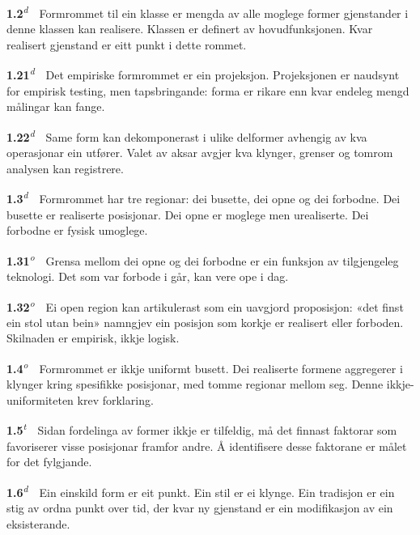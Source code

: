 \documentclass[10pt]{article}
\begin{document}
\noindent\textbf{1.2}\textsuperscript{\textit{d}}~~Formrommet til ein klasse er mengda av alle moglege former gjenstander i denne klassen kan realisere. Klassen er definert av hovudfunksjonen. Kvar realisert gjenstand er eitt punkt i dette rommet.




\noindent\textbf{1.21}\textsuperscript{\textit{d}}~~Det empiriske formrommet er ein projeksjon. Projeksjonen er naudsynt for empirisk testing, men tapsbringande: forma er rikare enn kvar endeleg mengd målingar kan fange.




\noindent\textbf{1.22}\textsuperscript{\textit{d}}~~Same form kan dekomponerast i ulike delformer avhengig av kva operasjonar ein utfører. Valet av aksar avgjer kva klynger, grenser og tomrom analysen kan registrere.




\noindent\textbf{1.3}\textsuperscript{\textit{d}}~~Formrommet har tre regionar: dei busette, dei opne og dei forbodne. Dei busette er realiserte posisjonar. Dei opne er moglege men urealiserte. Dei forbodne er fysisk umoglege.




\noindent\textbf{1.31}\textsuperscript{\textit{o}}~~Grensa mellom dei opne og dei forbodne er ein funksjon av tilgjengeleg teknologi. Det som var forbode i går, kan vere ope i dag.




\noindent\textbf{1.32}\textsuperscript{\textit{o}}~~Ei open region kan artikulerast som ein uavgjord proposisjon: «det finst ein stol utan bein» namngjev ein posisjon som korkje er realisert eller forboden. Skilnaden er empirisk, ikkje logisk.




\noindent\textbf{1.4}\textsuperscript{\textit{o}}~~Formrommet er ikkje uniformt busett. Dei realiserte formene aggregerer i klynger kring spesifikke posisjonar, med tomme regionar mellom seg. Denne ikkje-uniformiteten krev forklaring.




\noindent\textbf{1.5}\textsuperscript{\textit{t}}~~Sidan fordelinga av former ikkje er tilfeldig, må det finnast faktorar som favoriserer visse posisjonar framfor andre. Å identifisere desse faktorane er målet for det fylgjande.




\noindent\textbf{1.6}\textsuperscript{\textit{d}}~~Ein einskild form er eit punkt. Ein stil er ei klynge. Ein tradisjon er ein stig av ordna punkt over tid, der kvar ny gjenstand er ein modifikasjon av ein eksisterande.
\end{document}
